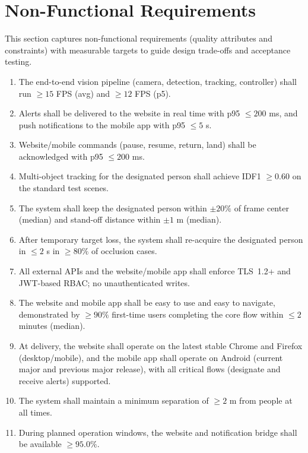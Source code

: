 \documentclass[12pt,a4paper]{report}
\begin{document}
\section{Non-Functional Requirements}
\noindent
This section captures non-functional requirements (quality attributes and constraints) with measurable targets to guide design trade-offs and acceptance testing.


\begin{enumerate}[label=\textbf{NFR\arabic*}, leftmargin=*]

\item The end-to-end vision pipeline (camera, detection, tracking, controller) shall run $\geq 15$ FPS (avg) and $\geq 12$ FPS (p5).

\item Alerts shall be delivered to the website in real time with p95 $\leq 200$ ms, and push notifications to the mobile app with p95 $\leq 5$ s.

\item Website/mobile commands (pause, resume, return, land) shall be acknowledged with p95 $\leq 200$ ms.

\item Multi-object tracking for the designated person shall achieve \ac{IDF1} $\geq 0.60$ on the standard test scenes.

\item The system shall keep the designated person within $\pm 20\%$ of frame center (median) and stand-off distance within $\pm 1$ m (median).

\item After temporary target loss, the system shall re-acquire the designated person in $\leq 2$ s in $\geq 80\%$ of occlusion cases.

\item All external \ac{API}s and the website/mobile app shall enforce \ac{TLS}~1.2+ and \ac{JWT}-based \ac{RBAC}; no unauthenticated writes.

\item The website and mobile app shall be easy to use and easy to navigate, demonstrated by $\geq 90\%$ first-time users completing the core flow within $\leq 2$ minutes (median).

\item At delivery, the website shall operate on the latest stable Chrome and Firefox (desktop/mobile), and the mobile app shall operate on Android (current major and previous major release), with all critical flows (designate and receive alerts) supported.

\item The system shall maintain a minimum separation of $\geq 2$ m from people at all times.

\item During planned operation windows, the website and notification bridge shall be available $\geq 95.0\%$.


\end{enumerate}
\end{document}
